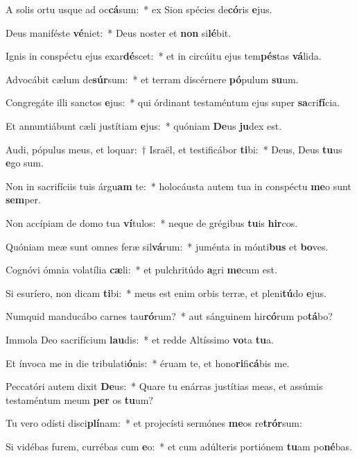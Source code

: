 \item A solis ortu usque ad oc\textbf{cá}sum:~* ex Sion spécies de\textbf{có}ris \textbf{e}jus.
\item Deus maniféste \textbf{vé}niet:~* Deus noster et \textbf{non} si\textbf{lé}bit.
\item Ignis in conspéctu ejus exar\textbf{dé}scet:~* et in circúitu ejus tem\textbf{pés}tas \textbf{vá}lida.
\item Advocábit cælum de\textbf{súr}sum:~* et terram discérnere \textbf{pó}pulum \textbf{su}um.
\item Congregáte illi sanctos \textbf{e}jus:~* qui órdinant testaméntum ejus super \textbf{sa}cri\textbf{fí}cia.
\item Et annuntiábunt cæli justítiam \textbf{e}jus:~* quóniam \textbf{De}us \textbf{ju}dex est.
\item Audi, pópulus meus, et loquar:~† Israël, et testificábor \textbf{ti}bi:~* Deus, Deus \textbf{tu}us \textbf{e}go sum.
\item Non in sacrifíciis tuis árgu\textbf{am} te:~* holocáusta autem tua in conspéctu \textbf{me}o sunt \textbf{sem}per.
\item Non accípiam de domo tua \textbf{ví}tulos:~* neque de grégibus \textbf{tu}is \textbf{hir}cos.
\item Quóniam meæ sunt omnes feræ sil\textbf{vá}rum:~* juménta in mónti\textbf{bus} et \textbf{bo}ves.
\item Cognóvi ómnia volatília \textbf{cæ}li:~* et pulchritúdo \textbf{a}gri \textbf{me}cum est.
\item Si esuríero, non dicam \textbf{ti}bi:~* meus est enim orbis terræ, et pleni\textbf{tú}do \textbf{e}jus.
\item Numquid manducábo carnes tau\textbf{ró}rum?~* aut sánguinem hir\textbf{có}rum po\textbf{tá}bo?
\item Immola Deo sacrifícium \textbf{lau}dis:~* et redde Altíssimo \textbf{vo}ta \textbf{tu}a.
\item Et ínvoca me in die tribulati\textbf{ó}nis:~* éruam te, et hono\textbf{ri}fi\textbf{cá}bis me.
\item Peccatóri autem dixit \textbf{De}us:~* Quare tu enárras justítias meas, et assúmis testaméntum meum \textbf{per} os \textbf{tu}um?
\item Tu vero odísti disci\textbf{plí}nam:~* et projecísti sermónes \textbf{me}os re\textbf{trór}sum:
\item Si vidébas furem, currébas cum \textbf{e}o:~* et cum adúlteris portiónem \textbf{tu}am po\textbf{né}bas.

